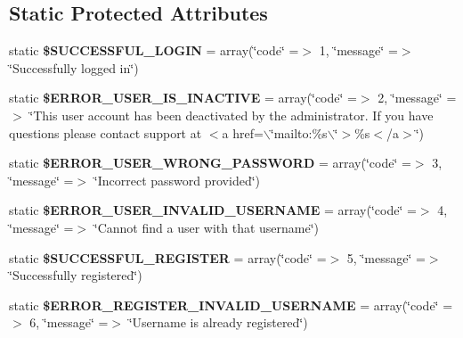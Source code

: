 \subsection*{Static Protected Attributes}
\begin{DoxyCompactItemize}
\item 
\hypertarget{class_api_controller_a1570871162fa0b38b1bc23937a23cf62}{
static {\bfseries \$SUCCESSFUL\_\-LOGIN} = array(\char`\"{}code\char`\"{} =$>$ 1, \char`\"{}message\char`\"{} =$>$ \char`\"{}Successfully logged in\char`\"{})}
\label{class_api_controller_a1570871162fa0b38b1bc23937a23cf62}

\item 
\hypertarget{class_api_controller_aa2a757d915e4d9e933c22363b265dedf}{
static {\bfseries \$ERROR\_\-USER\_\-IS\_\-INACTIVE} = array(\char`\"{}code\char`\"{} =$>$ 2, \char`\"{}message\char`\"{} =$>$ \char`\"{}This user account has been deactivated by the administrator. If you have questions please contact support at $<$a href=$\backslash$\char`\"{}mailto:\%s$\backslash$\char`\"{}$>$\%s$<$/a$>$\char`\"{})}
\label{class_api_controller_aa2a757d915e4d9e933c22363b265dedf}

\item 
\hypertarget{class_api_controller_a02a22a038795836ed2693ede799f2f28}{
static {\bfseries \$ERROR\_\-USER\_\-WRONG\_\-PASSWORD} = array(\char`\"{}code\char`\"{} =$>$ 3, \char`\"{}message\char`\"{} =$>$ \char`\"{}Incorrect password provided\char`\"{})}
\label{class_api_controller_a02a22a038795836ed2693ede799f2f28}

\item 
\hypertarget{class_api_controller_a03dc9661436ff6f3933292aee400cb7a}{
static {\bfseries \$ERROR\_\-USER\_\-INVALID\_\-USERNAME} = array(\char`\"{}code\char`\"{} =$>$ 4, \char`\"{}message\char`\"{} =$>$ \char`\"{}Cannot find a user with that username\char`\"{})}
\label{class_api_controller_a03dc9661436ff6f3933292aee400cb7a}

\item 
\hypertarget{class_api_controller_aaf1e1e35b3db5292a6af29a1d3622304}{
static {\bfseries \$SUCCESSFUL\_\-REGISTER} = array(\char`\"{}code\char`\"{} =$>$ 5, \char`\"{}message\char`\"{} =$>$ \char`\"{}Successfully registered\char`\"{})}
\label{class_api_controller_aaf1e1e35b3db5292a6af29a1d3622304}

\item 
\hypertarget{class_api_controller_a57acd37813a22fafde7c348bb1907d9c}{
static {\bfseries \$ERROR\_\-REGISTER\_\-INVALID\_\-USERNAME} = array(\char`\"{}code\char`\"{} =$>$ 6, \char`\"{}message\char`\"{} =$>$ \char`\"{}Username is already registered\char`\"{})}
\label{class_api_controller_a57acd37813a22fafde7c348bb1907d9c}


\end{DoxyCompactItemize}
